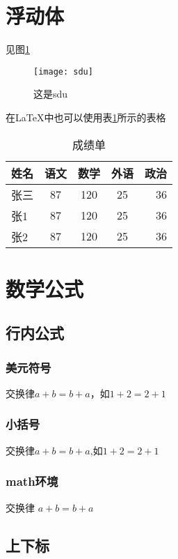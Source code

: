 \documentclass{article} %
\begin{document}
	\section{浮动体}
		见图\ref{img_sdu}
		\begin{figure}[htbp]
			\centering %
			\texttt{[image: sdu]}
			\caption{这是sdu} \label{img_sdu}
		\end{figure}
		
		
		\newpage
		
		在\LaTeX{}中也可以使用表\ref{tab-score}所示的表格
		\begin{table}[htbp]
			\centering
			\caption{成绩单}\label{tab-score}
				\begin{tabular}{|l| c| c| c|  r|}%
				\hline%
				姓名&语文&数学&外语&政治\\%
				\hline
				张三&87&120&25&36\\
				\hline
				张1&87&120&25&36\\
				\hline
				张2&87&120&25&36\\
				\hline
			\end{tabular}
		\end{table}
	
	\newpage
		
	\section{数学公式}
		\subsection{行内公式}
			\subsubsection{美元符号}
				交换律$a+b=b+a$，如$1+2=2+1$
			\subsubsection{小括号}
				交换律\(a+b=b+a\),如\(1+2=2+1\)
			\subsubsection{math环境}
				交换律
					\begin{math}
						a+b=b+a
					\end{math}
		\subsection{上下标}
\end{document}
